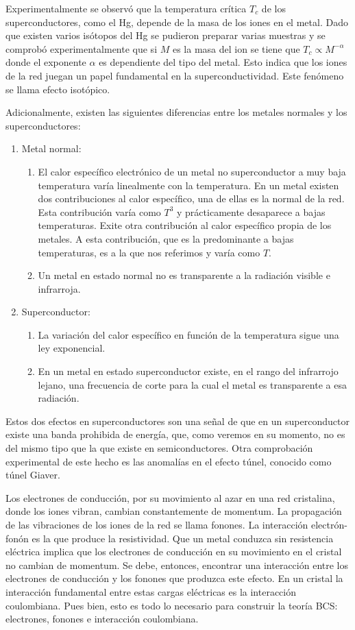 Experimentalmente se observó que la temperatura crítica $T_c$ de los superconductores, como el Hg, depende de la masa de los iones en el metal. Dado que existen varios isótopos del Hg se pudieron preparar varias muestras y se comprobó experimentalmente que si $M$ es la masa del ion se tiene que $T_c \propto M^{-\alpha}$ donde el exponente $\alpha$ es dependiente del tipo del metal. Esto indica que los iones de la red juegan un papel fundamental en la superconductividad. Este fenómeno se llama efecto isotópico.

Adicionalmente, existen las siguientes diferencias entre los metales normales y los superconductores:

\begin{enumerate}
\item Metal normal:
\begin{enumerate}
    \item El calor específico electrónico de un metal no superconductor a muy baja temperatura varía linealmente con la temperatura. En un metal existen dos contribuciones al calor específico, una de ellas es la normal de la red. Esta contribución varía como $T^3$ y prácticamente desaparece a bajas temperaturas. Exite otra contribución al calor específico propia de los metales. A esta contribución, que es la predominante a bajas temperaturas, es a la que nos referimos y varía como $T$.
    \item Un metal en estado normal no es transparente a la radiación visible e infrarroja.
\end{enumerate}
\item Superconductor:
\begin{enumerate}
    \item La variación del calor específico en función de la temperatura sigue una ley exponencial.
    \item En un metal en estado superconductor existe, en el rango del infrarrojo lejano, una frecuencia de corte para la cual el metal es transparente a esa radiación.
\end{enumerate}
\end{enumerate}

Estos dos efectos en superconductores son una señal de que en un superconductor existe una banda prohibida de energía, que, como veremos en su momento, no es del mismo tipo que la que existe en semiconductores. Otra comprobación experimental de este hecho es las anomalías en el efecto túnel, conocido como túnel Giaver.

Los electrones de conducción, por su movimiento al azar en una red cristalina, donde los iones vibran, cambian constantemente de momentum. La propagación de las vibraciones de los iones de la red se llama fonones. La interacción electrón-fonón es la que produce la resistividad. Que un metal conduzca sin resistencia eléctrica implica que los electrones de conducción en su movimiento en el cristal no cambian de momentum. Se debe, entonces, encontrar una interacción entre los electrones de conducción y los fonones que produzca este efecto. En un cristal la interacción fundamental entre estas cargas eléctricas es la interacción coulombiana. Pues bien, esto es todo lo necesario para construir la teoría BCS: electrones, fonones e interacción coulombiana.

